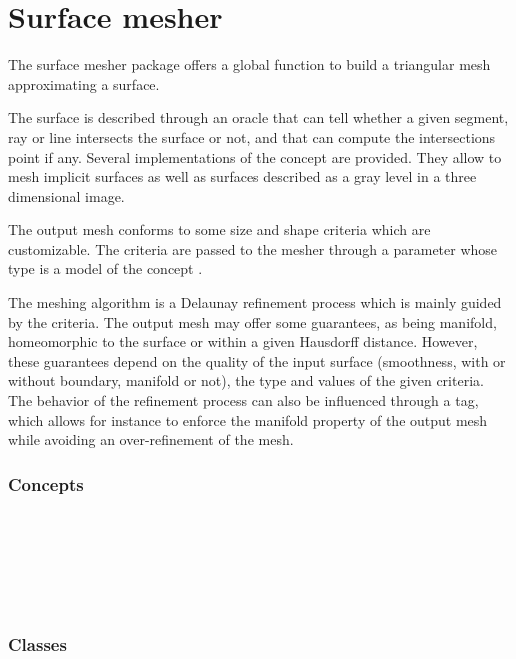 \chapter{Surface mesher}


The surface mesher package offers a global function
to build a triangular mesh approximating a surface.

The surface is described through an oracle that can tell whether a
given segment, ray or line  intersects the surface or not, and that can compute the
intersections point if any. Several implementations of
the  concept are provided. They allow to mesh
implicit surfaces as well as  surfaces described as a gray level in a three
dimensional image.

The output mesh conforms to some size and shape criteria 
which are customizable. The criteria are passed to the mesher
through a parameter 
whose type is a model of the
concept .

The meshing algorithm is a Delaunay refinement process
which is mainly guided by the criteria. 
The output mesh may offer some guarantees, as being manifold,
homeomorphic to the surface or within a given
Hausdorff distance.  However, these guarantees depend 
on the quality of the input surface (smoothness, with or without
boundary, manifold or  not),
the type and values of the given criteria. 
The behavior of the refinement process can also be influenced through
a tag, which allows for instance to enforce the manifold property
of  the output mesh  while avoiding an over-refinement of the mesh.


\subsection*{Concepts}

\\
 \\
 \\
 \\
 \\


\subsection*{Classes}
 \\
 \\
 \\
 \\

